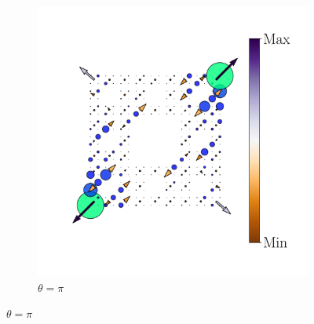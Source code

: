 \begin{figure}[tbh!]
\begin{minipage}[h!]{1.0\textwidth}
\begin{subfigure}[b!]{0.2 \textwidth}
         \end{subfigure}\hspace*{-0.5em}
          \begin{subfigure}[b!]{0.2 \textwidth}
             \caption*{$\theta = \pi$}
             \includegraphics[width=\textwidth]{Imagenes/Resultados_pump_Fractal/x/hoti_pomp_x_pos5.pdf}
         \end{subfigure}\hspace*{-0.5em}
     \end{minipage}\vspace*{-1em}
     

\end{figure}
